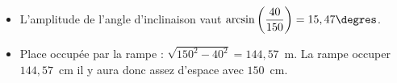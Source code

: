 %
%
    \begin{itemize}
        \item
        L'amplitude de l'angle d'inclinaison vaut $\arcsin\left(\dfrac{40}{150}\right)=15,47\degres$.
        \item
        Place occupée par la rampe : $\sqrt{150^2 - 40^2} = 144,57$~m. La rampe occuper $144,57$~cm il y aura donc assez d'espace avec $150$~cm.
    \end{itemize}
